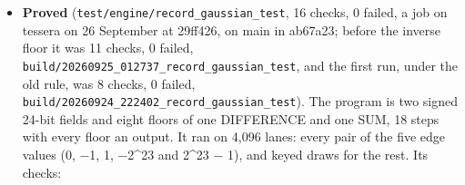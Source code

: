 \begin{itemize}
\item \textbf{Proved} (\texttt{test/\allowbreak{}engine/\allowbreak{}record\_\allowbreak{}gaussian\_\allowbreak{}test}, 16 checks, 0 failed, a job on tessera on 26 September at 29ff426, on main in ab67a23; before the inverse floor it was 11 checks, 0 failed, \texttt{build/\allowbreak{}20260925\_\allowbreak{}012737\_\allowbreak{}record\_\allowbreak{}gaussian\_\allowbreak{}test}, and the first run, under the old rule, was 8 checks, 0 failed, \texttt{build/\allowbreak{}20260924\_\allowbreak{}222402\_\allowbreak{}record\_\allowbreak{}gaussian\_\allowbreak{}test}). The program is two signed 24-bit fields and eight floors of one DIFFERENCE and one SUM, 18 steps with every floor an output. It ran on 4,096 lanes: every pair of the five edge values (0, −1, 1, −2\textasciicircum{}23 and 2\textasciicircum{}23 − 1), and keyed draws for the rest. Its checks:


\end{itemize}

